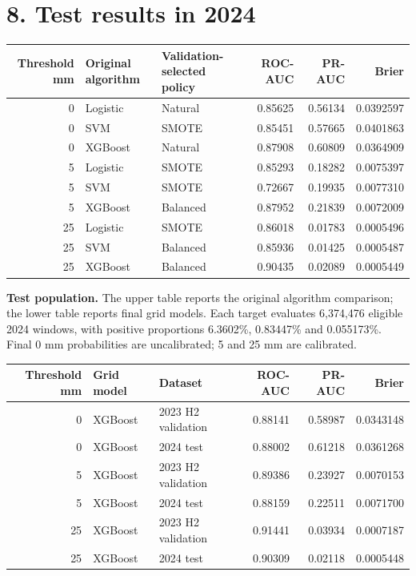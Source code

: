 \documentclass[UTF8,fontset=fandol,10pt,a4paper,landscape]{ctexart}
\begin{document}
\clearpage\section*{8. Test results in 2024}
\begin{center}\begin{tabular}{rllrrr}\toprule
Threshold mm & Original algorithm & Validation-selected policy & ROC-AUC & PR-AUC & Brier\\\midrule
0 & Logistic & Natural & 0.85625 & 0.56134 & 0.0392597\\
0 & SVM & SMOTE & 0.85451 & 0.57665 & 0.0401863\\
0 & XGBoost & Natural & 0.87908 & 0.60809 & 0.0364909\\
5 & Logistic & SMOTE & 0.85293 & 0.18282 & 0.0075397\\
5 & SVM & SMOTE & 0.72667 & 0.19935 & 0.0077310\\
5 & XGBoost & Balanced & 0.87952 & 0.21839 & 0.0072009\\
25 & Logistic & SMOTE & 0.86018 & 0.01783 & 0.0005496\\
25 & SVM & Balanced & 0.85936 & 0.01425 & 0.0005487\\
25 & XGBoost & Balanced & 0.90435 & 0.02089 & 0.0005449\\
\bottomrule\end{tabular}\end{center}

\textbf{Test population.} The upper table reports the original algorithm comparison; the lower table reports final grid models. Each target evaluates 6,374,476 eligible 2024 windows, with positive proportions 6.3602\%, 0.83447\% and 0.055173\%. Final 0 mm probabilities are uncalibrated; 5 and 25 mm are calibrated.

\begin{center}\begin{tabular}{rllrrr}\toprule
Threshold mm & Grid model & Dataset & ROC-AUC & PR-AUC & Brier\\\midrule
0 & XGBoost & 2023 H2 validation & 0.88141 & 0.58987 & 0.0343148\\
0 & XGBoost & 2024 test & 0.88002 & 0.61218 & 0.0361268\\
5 & XGBoost & 2023 H2 validation & 0.89386 & 0.23927 & 0.0070153\\
5 & XGBoost & 2024 test & 0.88159 & 0.22511 & 0.0071700\\
25 & XGBoost & 2023 H2 validation & 0.91441 & 0.03934 & 0.0007187\\
25 & XGBoost & 2024 test & 0.90309 & 0.02118 & 0.0005448\\
\bottomrule\end{tabular}\end{center}
\end{document}
